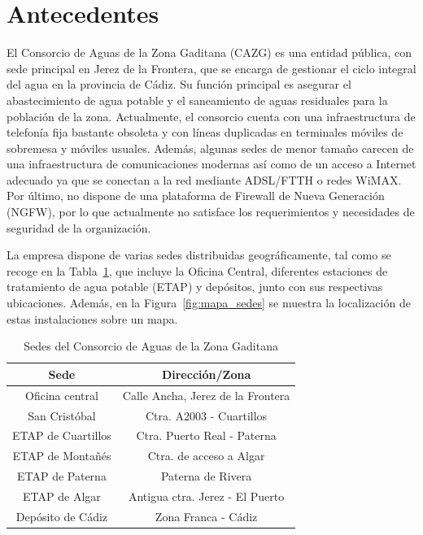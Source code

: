 \section{Antecedentes}
El Consorcio de Aguas de la Zona Gaditana (CAZG) es una entidad pública, con sede principal en Jerez de la Frontera, que se encarga de gestionar el ciclo integral del agua en la provincia de Cádiz. Su función principal es asegurar el abastecimiento de agua potable y el saneamiento de aguas residuales para la población de la zona. Actualmente, el consorcio cuenta con una infraestructura de telefonía fija bastante obsoleta y con líneas duplicadas en terminales móviles de sobremesa y móviles usuales. Además, algunas sedes de menor tamaño carecen de una infraestructura de comunicaciones modernas así como de un acceso a Internet adecuado ya que se conectan a la red mediante ADSL/FTTH o redes WiMAX. Por último, no dispone de una plataforma de Firewall de Nueva Generación (NGFW), por lo que actualmente no satisface los requerimientos y necesidades de seguridad de la organización.

\vspace{0.5cm}
La empresa dispone de varias sedes distribuidas geográficamente, tal como se recoge en la Tabla~\ref{tab:sedes}, que incluye la Oficina Central, diferentes estaciones de tratamiento de agua potable (ETAP) y depósitos, junto con sus respectivas ubicaciones. Además, en la Figura~\ref{fig:mapa_sedes} se muestra la localización de estas instalaciones sobre un mapa.

\begin{table}[H]
	\centering
  \small
	\begin{tabular}{|c|c|}
		\hline
		\textbf{Sede}      & \textbf{Dirección/Zona}           \\ \hline
		Oficina central    & Calle Ancha, Jerez de la Frontera \\ \hline
		San Cristóbal      & Ctra. A2003 - Cuartillos          \\ \hline
		ETAP de Cuartillos & Ctra. Puerto Real - Paterna       \\ \hline
		ETAP de Montañés   & Ctra. de acceso a Algar           \\ \hline
		ETAP de Paterna    & Paterna de Rivera                 \\ \hline
		ETAP de Algar      & Antigua ctra. Jerez - El Puerto   \\ \hline
		Depósito de Cádiz  & Zona Franca - Cádiz               \\ \hline
	\end{tabular}
	\caption{Sedes del Consorcio de Aguas de la Zona Gaditana}
	\label{tab:sedes}
\end{table}

